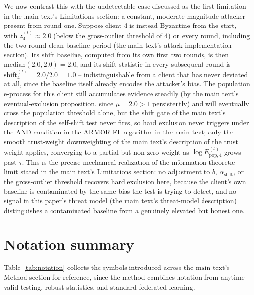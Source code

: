 \documentclass[a4paper,11pt]{article}
\begin{document}
We now contrast this with the undetectable case discussed as the first limitation in the main text's Limitations section: a constant, moderate-magnitude attacker present from round one. Suppose client 4 is instead Byzantine from the start, with $z_4^{(t)} \approx 2.0$ (below the gross-outlier threshold of 4) on every round, including the two-round clean-baseline period (the main text's attack-implementation section). Its shift baseline, computed from its own first two rounds, is then $\mathrm{median}(2.0, 2.0) = 2.0$, and its shift statistic in every subsequent round is $\mathrm{shift}_4^{(t)} = 2.0/2.0 = 1.0$ -- indistinguishable from a client that has never deviated at all, since the baseline itself already encodes the attacker's bias. The population e-process for this client still accumulates evidence steadily (by the main text's eventual-exclusion proposition, since $\mu=2.0>1$ persistently) and will eventually cross the population threshold alone, but the shift gate of the main text's description of the self-shift test never fires, so hard exclusion never triggers under the AND condition in the ARMOR-FL algorithm in the main text; only the smooth trust-weight downweighting of the main text's description of the trust weight applies, converging to a partial but non-zero weight as $\log E_{\mathrm{pop},4}^{(t)}$ grows past $\tau$. This is the precise mechanical realization of the information-theoretic limit stated in the main text's Limitations section: no adjustment to $b$, $\alpha_{\mathrm{shift}}$, or the gross-outlier threshold recovers hard exclusion here, because the client's own baseline is contaminated by the same bias the test is trying to detect, and no signal in this paper's threat model (the main text's threat-model description) distinguishes a contaminated baseline from a genuinely elevated but honest one.

\section{Notation summary}\label{app:notation}

Table~\ref{tab:notation} collects the symbols introduced across the main text's Method section for reference, since the method combines notation from anytime-valid testing, robust statistics, and standard federated learning.
\end{document}
